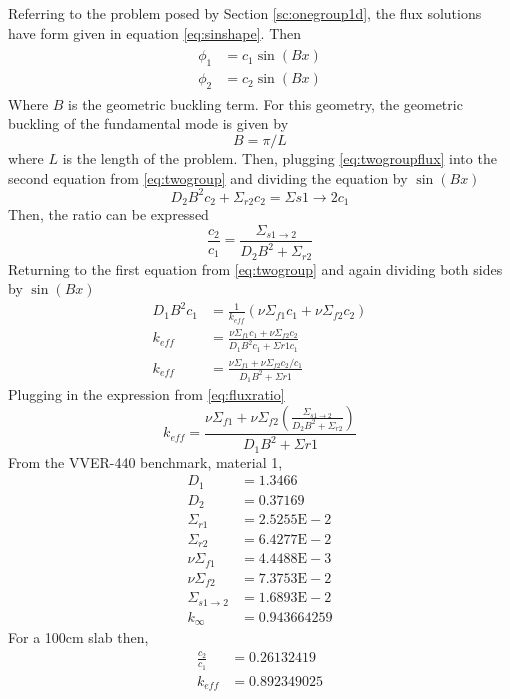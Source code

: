   Referring to the problem posed by Section \ref{sc:onegroup1d}, the flux 
  solutions have form given in equation \eqref{eq:sinshape}. Then
  \begin{align} \label{eq:twogroupflux}
  \begin{split}
    \phi_1 &= c_1 \sin(Bx) \\
    \phi_2 &= c_2 \sin(Bx)
  \end{split}
  \end{align}
  Where $B$ is the geometric buckling term. For this geometry, the geometric 
  buckling of the fundamental mode is given by 
  \begin{equation}
    B = \pi/L
  \end{equation}
  where $L$ is the length of the problem. Then, plugging 
  \eqref{eq:twogroupflux} into the second equation from \eqref{eq:twogroup} 
  and dividing the equation by $\sin(Bx)$
  \begin{equation}
    D_2 B^2 c_2 + \Sigma_{r2} c_2 = \Sigma{s1\rightarrow2} c_1
  \end{equation}
  Then, the ratio can be expressed
  \begin{equation} \label{eq:fluxratio}
    \frac{c_2}{c_1} = \frac{\Sigma_{s1\rightarrow2}}{D_2 B^2 + \Sigma_{r2}}
  \end{equation}
  Returning to the first equation from \eqref{eq:twogroup} and again dividing
  both sides by $\sin(Bx)$
  \begin{align}
    D_1 B^2 c_1 &= \frac{1}{k_{eff}} \left( \nu \Sigma_{f1} c_1 + 
      \nu \Sigma_{f2} c_2\right)\\
    k_{eff} &= \frac{\nu \Sigma_{f1} c_1 + \nu \Sigma_{f2} c_2}
      {D_1 B^2 c_1 + \Sigma{r1} c_1}\\
    k_{eff} &= \frac{\nu \Sigma_{f1} + \nu \Sigma_{f2} c_2/c_1}
      {D_1 B^2 + \Sigma{r1}}
  \end{align}
  Plugging in the expression from \eqref{eq:fluxratio}
  \begin{equation}
    k_{eff} = \frac{\nu \Sigma_{f1} + \nu \Sigma_{f2} 
      \left(\frac{\Sigma_{s1\rightarrow2}}{D_2B^2+\Sigma_{r2}}\right)}
      {D_1 B^2 + \Sigma{r1}}
  \end{equation}
  From the VVER-440 benchmark, material 1,
  \begin{align*}
    D_1 &= 1.3466  \\
    D_2 &= 0.37169 \\
    \Sigma_{r1} &= 2.5255\text{E}-2\\
    \Sigma_{r2} &= 6.4277\text{E}-2\\
    \nu \Sigma_{f1}  &= 4.4488\text{E}-3\\
    \nu \Sigma_{f2}  &= 7.3753\text{E}-2\\
    \Sigma_{s1\rightarrow2} &= 1.6893\text{E}-2 \\
    k_{\infty} &= 0.943664259
  \end{align*}
  For a 100cm slab then,
  \begin{align*}
    \frac{c_2}{c_1} &= 0.26132419 \\
    k_{eff} &= 0.892349025
  \end{align*}

